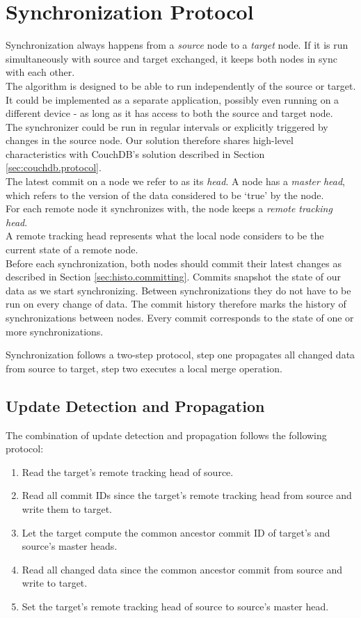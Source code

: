 
\section{Synchronization Protocol}
\label{sec:histo.protocol}
Synchronization always happens from a \emph{source} node to a \emph{target} node.
If it is run simultaneously with source and target exchanged, it keeps both nodes in sync with each other.\\
The algorithm is designed to be able to run independently of the source or target.
It could be implemented as a separate application, possibly even running on a different device - as long as it has access to both the source and target node.\\
The synchronizer could be run in regular intervals or explicitly triggered by changes in the source node.
Our solution therefore shares high-level characteristics with CouchDB's solution described in Section \ref{sec:couchdb.protocol}.\\

The latest commit on a node we refer to as its \emph{head}.
A node has a \emph{master head}, which refers to the version of the data considered to be `true' by the node.\\
For each remote node it synchronizes with, the node keeps a \emph{remote tracking head}.\\
A remote tracking head represents what the local node considers to be the current state of a remote node.\\
Before each synchronization, both nodes should commit their latest changes as described in Section \ref{sec:histo.committing}.
Commits snapshot the state of our data as we start synchronizing.
Between synchronizations they do not have to be run on every change of data.
The commit history therefore marks the history of synchronizations between nodes.
Every commit corresponds to the state of one or more synchronizations.

Synchronization follows a two-step protocol, step one propagates all changed data from source to target, step two executes a local merge operation.

\subsection{Update Detection and Propagation}
\label{sec:histo.protocol.detection-propagation}
The combination of update detection and propagation follows the following protocol:

\begin{enumerate}
\item Read the target's remote tracking head of source.
\item Read all commit IDs since the target's remote tracking head from source and write them to target.
\item Let the target compute the common ancestor commit ID of target's and source's master heads.
\item Read all changed data since the common ancestor commit from source and write to target.
\item Set the target's remote tracking head of source to source's master head.
\end{enumerate}


